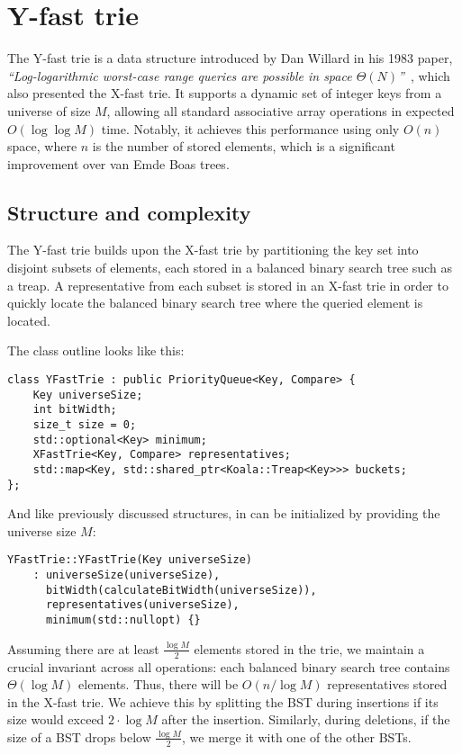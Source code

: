 \section{Y-fast trie}

The Y-fast trie is a data structure introduced by Dan Willard in his 1983 paper, \emph{``Log-logarithmic worst-case range queries are possible in space \( \Theta(N) \)''}~\cite{Willard1983}, which also presented the X-fast trie. It supports a dynamic set of integer keys from a universe of size \( M \), allowing all standard associative array operations in expected \( O(\log \log M) \) time. Notably, it achieves this performance using only \( O(n) \) space, where \( n \) is the number of stored elements, which is a significant improvement over van Emde Boas trees.

\subsection{Structure and complexity}

The Y-fast trie builds upon the X-fast trie by partitioning the key set into disjoint subsets of elements, each stored in a balanced binary search tree such as a treap. A representative from each subset is stored in an X-fast trie in order to quickly locate the balanced binary search tree where the queried element is located.

The class outline looks like this:
\begin{verbatim}
class YFastTrie : public PriorityQueue<Key, Compare> {
    Key universeSize;
    int bitWidth;
    size_t size = 0;
    std::optional<Key> minimum;
    XFastTrie<Key, Compare> representatives;
    std::map<Key, std::shared_ptr<Koala::Treap<Key>>> buckets;
};
\end{verbatim}

And like previously discussed structures, in can be initialized by providing the universe size \(M\):

\begin{verbatim}
YFastTrie::YFastTrie(Key universeSize)
    : universeSize(universeSize),
      bitWidth(calculateBitWidth(universeSize)),
      representatives(universeSize),
      minimum(std::nullopt) {}
\end{verbatim}

Assuming there are at least \( \frac{\log M}{2} \) elements stored in the trie, we maintain a crucial invariant across all operations: each balanced binary search tree contains \( \Theta(\log M) \) elements. Thus, there will be \( O(n / \log M) \) representatives stored in the X-fast trie. We achieve this by splitting the BST during insertions if its size would exceed \( 2 \cdot \log M \) after the insertion. Similarly, during deletions, if the size of a BST drops below \( \frac{\log M}{2} \), we merge it with one of the other BSTs. 

